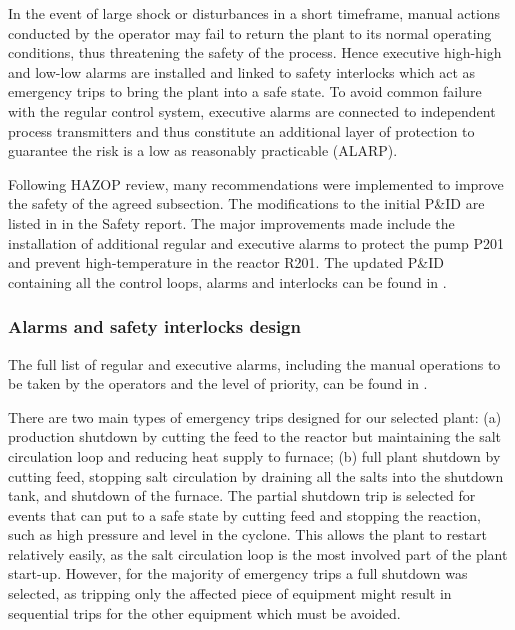 In the event of large shock or disturbances in a short timeframe, manual actions conducted by the operator may fail to return the plant to its normal operating conditions, thus threatening the safety of the process. Hence executive high-high and low-low alarms are installed and linked to safety interlocks which act as emergency trips to bring the plant into a safe state. To avoid common failure with the regular control system, executive alarms are connected to independent process transmitters and thus constitute an additional layer of protection to guarantee the risk is a low as reasonably practicable (ALARP).  

Following HAZOP review, many recommendations were implemented to improve the safety of the agreed subsection. The modifications to the initial P\&ID are listed in  in the Safety report. The major improvements made include the installation of additional regular and executive alarms to protect the pump P201 and prevent high-temperature in the reactor R201. The updated P\&ID containing all the control loops, alarms and interlocks can be found in .
 

\subsubsection{Alarms and safety interlocks design}

The full list of regular and executive alarms, including the manual operations to be taken by the operators and the level of priority, can be found in .



There are two main types of emergency trips designed for our selected plant: (a) production shutdown by cutting the feed to the reactor but maintaining the salt circulation loop and reducing heat supply to furnace; (b) full plant shutdown by cutting feed, stopping salt circulation by draining all the salts into the shutdown tank, and shutdown of the furnace. The partial shutdown trip is selected for events that can put to a safe state by cutting feed and stopping the reaction, such as high pressure and level in the cyclone. This allows the plant to restart relatively easily, as the salt circulation loop is the most involved part of the plant start-up. However, for the majority of emergency trips a full shutdown was selected, as tripping only the affected piece of equipment might result in sequential trips for the other equipment which must be avoided.

